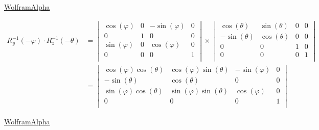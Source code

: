 \documentclass[a4paper]{article}
\theoremstyle{hangindent}
\theoremstyle{hangindent}
\begin{document}
\href{https://www.wolframalpha.com/input/?i=%7B%7Bcos(-theta),sin(-theta),0,0%7D,%7B-sin(-theta),cos(-theta),0,0%7D,%7B0,0,1,0%7D,%7B0,0,0,1%7D%7D*%7B%7Bcos(-phi),0,-sin(-phi),0%7D,%7B0,1,0,0%7D,%7Bsin(-phi),0,cos(-phi),0%7D,%7B0,0,0,1%7D%7D}{WolframAlpha}

\begin{align*}
    R^{-1}_y(-\varphi) \cdot R^{-1}_z(-\theta)
    &=
    \begin{vmatrix}
        \cos(\varphi) & 0 & -\sin(\varphi) & 0 \\
        0             & 1 & 0              & 0 \\
        \sin(\varphi) & 0 & \cos(\varphi)  & 0 \\
        0             & 0 & 0              & 1 \\
    \end{vmatrix}
    \times
    \begin{vmatrix}
        \cos(\theta)  & \sin(\theta) & 0 & 0 \\
        -\sin(\theta) & \cos(\theta) & 0 & 0 \\
        0             & 0            & 1 & 0 \\
        0             & 0            & 0 & 1 \\
    \end{vmatrix}
    \\ &=
    \begin{vmatrix}
        \cos(\varphi)\cos(\theta) & \cos(\varphi)\sin(\theta) & -\sin(\varphi) & 0 \\
        -\sin(\theta)             & \cos(\theta)              & 0              & 0 \\
        \sin(\varphi)\cos(\theta) & \sin(\varphi)\sin(\theta) & \cos(\varphi)  & 0 \\
        0                         & 0                         & 0              & 1 \\
    \end{vmatrix}
\end{align*}

\href{https://www.wolframalpha.com/input/?i=%7B%7Bcos(phi),0,-sin(phi),0%7D,%7B0,1,0,0%7D,%7Bsin(phi),0,cos(phi),0%7D,%7B0,0,0,1%7D%7D*%7B%7Bcos(theta),sin(theta),0,0%7D,%7B-sin(theta),cos(theta),0,0%7D,%7B0,0,1,0%7D,%7B0,0,0,1%7D%7D}{WolframAlpha}
\end{document}
